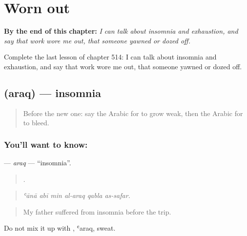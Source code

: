 
\chapter{Worn out}
\label{ch:ar-worn-out}

\begin{chapteropening}
\textbf{By the end of this chapter:} \emph{I can talk about insomnia and exhaustion, and say that work wore me out, that someone yawned or dozed off.}

Complete the last lesson of chapter 514: I can talk about insomnia and exhaustion, and say that work wore me out, that someone yawned or dozed off.
\end{chapteropening}

\section[\texorpdfstring{\ar{أرق} (araq)}{أرق (araq)}]{ (araq) — insomnia}

\label{lesson:AR-C514-araq}



\begin{quote}
Before the new one: say the Arabic for to grow weak, then the Arabic for to bleed.
\end{quote}

\subsection*{You'll want to know: }
\textbf{} — \emph{araq} — \textquotedblleft{}insomnia\textquotedblright{}.

\begin{quote}
     .
\end{quote}

\begin{quote}
\emph{ʿānā abī min al-araq qabla as-safar.}
\end{quote}

\begin{quote}
My father suffered from insomnia before the trip.
\end{quote}

Do not mix it up with , ʿaraq, sweat.

